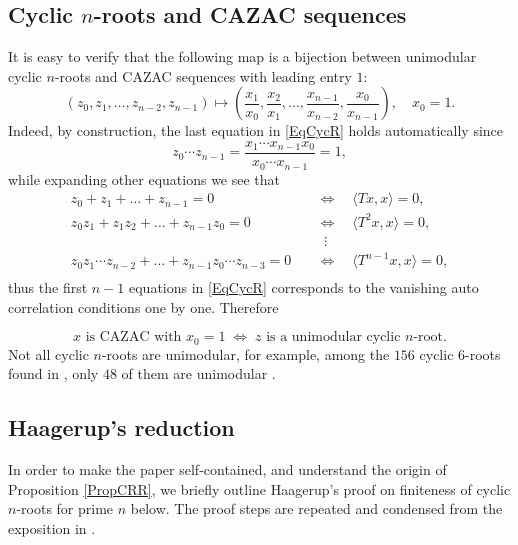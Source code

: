 \documentclass[A4,11pt]{article}
\newcommand{\bra}[1]{\langle#1\rangle}
\begin{document}
\subsection{Cyclic $n$-roots and CAZAC sequences} 
It is easy to verify that the following map is a bijection between unimodular cyclic $n$-roots and CAZAC sequences with leading entry $1$:
\begin{equation} \label{EqR2C}
(z_0,z_1,\ldots,z_{n-2},z_{n-1})\mapsto \left(\frac{x_1}{x_0}, \frac{x_2}{x_1}, \ldots, \frac{x_{n-1}}{x_{n-2}}, \frac{x_0}{x_{n-1}}\right), \quad x_0=1.
\end{equation}
Indeed, by construction, the last equation in \eqref{EqCycR} holds automatically since 
$$z_0\cdots z_{n-1}=\frac{x_1\cdots x_{n-1}x_0}{x_0\cdots x_{n-1}}=1,$$
while expanding other equations we see that
\begin{align*}
z_0+z_1+\ldots+z_{n-1}=0 \quad&\Leftrightarrow\quad \bra{Tx,x}=0, \\
z_0z_1+z_1z_2+\ldots+z_{n-1}z_0=0 \quad&\Leftrightarrow\quad \bra{T^2x,x}=0, \\
&\;\;\vdots \\
z_0z_1\cdots z_{n-2}+\ldots+z_{n-1}z_0\cdots z_{n-3}=0 \quad&\Leftrightarrow\quad \bra{T^{n-1}x,x}=0, \\
\end{align*}
thus the first $n-1$ equations in \eqref{EqCycR} corresponds to the vanishing auto correlation conditions one by one. Therefore

\begin{equation} \label{EqCR}
x \text{ is CAZAC with $x_0=1$} \;\Leftrightarrow\; z \text{ is a unimodular cyclic $n$-root}.
\end{equation}
Not all cyclic $n$-roots are unimodular, for example, among the $156$ cyclic $6$-roots found in \cite{bjorck1991}, only $48$ of them are unimodular \cite{haagerup1997}.

\subsection{Haagerup's reduction}
In order to make the paper self-contained, and understand the origin of Proposition \ref{PropCRR}, we briefly outline Haagerup's proof on finiteness of cyclic $n$-roots for prime $n$ below. The proof steps are repeated and condensed from the exposition in \cite{benedetto2019}. 
\end{document}
